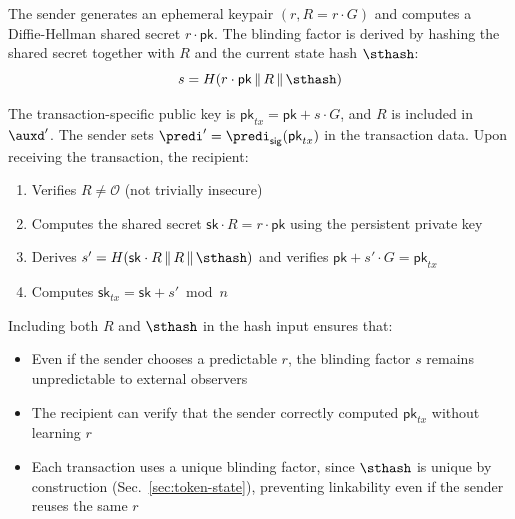 The sender generates an ephemeral keypair $(r, R = r \cdot G)$ and computes a Diffie-Hellman shared secret $r \cdot \mathsf{pk}$. The blinding factor is derived by hashing the shared secret together with $R$ and the current state hash $\sthash$:
$$s = H(r \cdot \mathsf{pk} \,\|\, R \,\|\, \sthash)$$

The transaction-specific public key is $\mathsf{pk}_{tx} = \mathsf{pk} + s \cdot G$, and $R$ is included in $\auxd'$. The sender sets $\predi' = \predi_\mathsf{sig}(\mathsf{pk}_{tx})$ in the transaction data. Upon receiving the transaction, the recipient:
\begin{enumerate}
\item Verifies $R \neq \mathcal{O}$ (not trivially insecure)
\item Computes the shared secret $\mathsf{sk} \cdot R = r \cdot \mathsf{pk}$ using the persistent private key
\item Derives $s' = H(\mathsf{sk} \cdot R \,\|\, R \,\|\, \sthash)$ and verifies $\mathsf{pk} + s' \cdot G = \mathsf{pk}_{tx}$
\item Computes $\mathsf{sk}_{tx} = \mathsf{sk} + s' \bmod n$
\end{enumerate}

Including both $R$ and $\sthash$ in the hash input ensures that:
\begin{itemize}
\item Even if the sender chooses a predictable $r$, the blinding factor $s$ remains unpredictable to external observers
\item The recipient can verify that the sender correctly computed $\mathsf{pk}_{tx}$ without learning $r$
\item Each transaction uses a unique blinding factor, since $\sthash$ is unique by construction (Sec.~\ref{sec:token-state}), preventing linkability even if the sender reuses the same $r$
\end{itemize}
